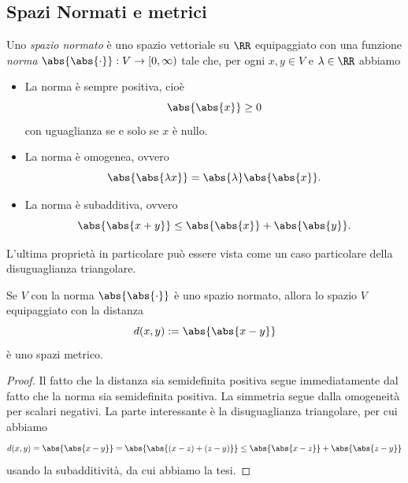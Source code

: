 \documentclass[11pt]{scrartcl}
\begin{document}
	\subsection{Spazi Normati e metrici}
	
	\begin{definition}
		Uno \textit{spazio normato} è uno spazio vettoriale su $\RR$ equipaggiato con una funzione \textit{norma} $\abs{\abs{\cdot}}:V\to [0,\infty)$ tale che, per ogni $x,y\in V$ e $\lambda\in \RR$ abbiamo
		\begin{itemize}
			\item La norma è sempre positiva, cioè
			$$\abs{\abs{x}}\ge 0$$
			con uguaglianza se e solo se $x$ è nullo.
			\item La norma è omogenea, ovvero
			$$\abs{\abs{\lambda x}}=\abs{\lambda}\abs{\abs{x}}.$$
			\item La norma è subadditiva, ovvero
			$$\abs{\abs{x+y}}\le \abs{\abs{x}}+\abs{\abs{y}}.$$ 
		\end{itemize}
		L'ultima proprietà in particolare può essere vista come un caso particolare della disuguaglianza triangolare.
	\end{definition}
	
	\begin{proposition}
		Se $V$ con la norma $\abs{\abs{\cdot}}$ è uno spazio normato, allora lo spazio $V$ equipaggiato con la distanza
		$$d(x,y):=\abs{\abs{x-y}}$$
		è uno spazi metrico.
	\end{proposition}
	\begin{proof}
		Il fatto che la distanza sia semidefinita positiva segue immediatamente dal fatto che la norma sia semidefinita positiva. La simmetria segue dalla omogeneità per scalari negativi. La parte interessante è la disuguaglianza triangolare, per cui abbiamo
		$$d(x,y)=\abs{\abs{x-y}}=\abs{\abs{\left(x-z\right)+\left(z-y\right)}}\le \abs{\abs{x-z}}+\abs{\abs{z-y}}$$
		usando la subadditività, da cui abbiamo la tesi.
	\end{proof}
	
\end{document}
